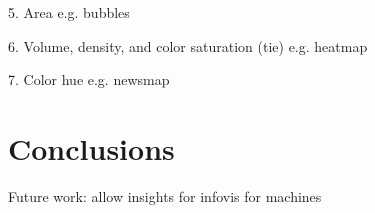 \documentclass[journal]{vgtc}                %
\begin{document}
5. Area e.g. bubbles

6. Volume, density, and color saturation (tie) e.g. heatmap

7. Color hue e.g. newsmap

\section{Conclusions}

Future work: allow insights for infovis for machines



%

%
%
%


\end{document}
